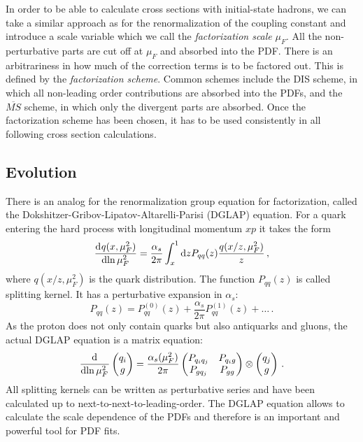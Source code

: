 In order to be able to calculate cross sections with initial-state hadrons, we can take a similar approach as for the renormalization of the coupling constant and introduce a scale variable which we call the \textit{factorization scale} $\mu_F$.
All the non-perturbative parts are cut off at $\mu_F$ and absorbed into the PDF.
There is an arbitrariness in how much of the correction terms is to be factored out.
This is defined by the \textit{factorization scheme}.
Common schemes include the DIS scheme, in which all non-leading order contributions are absorbed into the PDFs, and the $\overline{MS}$ scheme, in which only the divergent parts are absorbed.
Once the factorization scheme has been chosen, it has to be used consistently in all following cross section calculations.
%
\subsection{Evolution}
There is an analog for the renormalization group equation for factorization, called the Dokshitzer-Gribov-Lipatov-Altarelli-Parisi (DGLAP) equation.
For a quark entering the hard process with longitudinal momentum $xp$ it takes the form
%
\begin{equation}
	\dod{q(x,\mu_F^2)}{\ln{\mu_F^2}} = \frac{\alpha_s}{2 \pi} \int_x^1 \dif z P_{qq}(z) \frac{q(x/z,\mu_F^2)}{z} \, ,
\end{equation}
%
where $q(x/z,\mu_F^2)$ is the quark distribution.
The function $P_{qq}(z)$ is called splitting kernel.
It has a perturbative expansion in $\alpha_s$:
%
\begin{equation}
	P_{qq}(z) = P_{qq}^{(0)}(z) + \frac{\alpha_s}{2 \pi} P_{qq}^{(1)}(z) + \dots \, .
\end{equation}
%
As the proton does not only contain quarks but also antiquarks and gluons, the actual DGLAP equation is a matrix equation:
%
\begin{equation}
	\dod{}{\ln{\mu_F^2}} \begin{pmatrix} q_i \\ g \end{pmatrix} = \frac{\alpha_s(\mu_F^2)}{2 \pi}
	\begin{pmatrix}
		P_{q_i q_j}	&	P_{q_i g} \\
		P_{g q_j}	&	P_{gg}
	\end{pmatrix}
	\otimes \begin{pmatrix} q_j \\ g \end{pmatrix} \, .
	\label{eq:dglap}
\end{equation}
%
All splitting kernels can be written as perturbative series and have been calculated up to next-to-next-to-leading-order\cite{splittingkernel1,splittingkernel2}. 
The DGLAP equation allows to calculate the scale dependence of the PDFs and therefore is an important and powerful tool for PDF fits.
%
